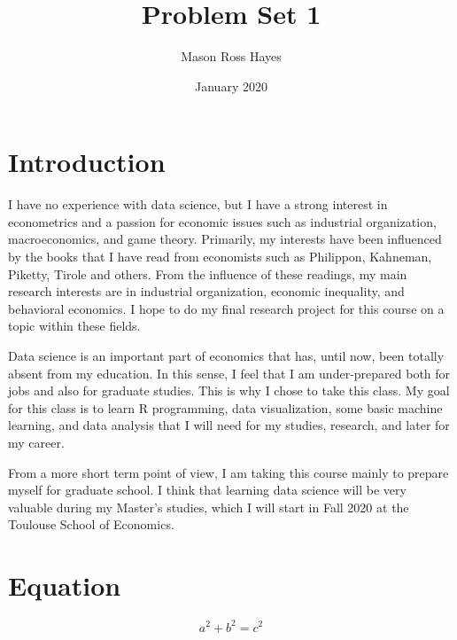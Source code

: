 \documentclass{article}
\title{Problem Set 1}
\author{Mason Ross Hayes}
\date{January 2020}
\begin{document}
\maketitle

\section{Introduction}
I have no experience with data science, but I have a strong interest in econometrics and a passion for economic issues such as industrial organization, macroeconomics, and game theory. Primarily, my interests have been influenced by the books that I have read from economists such as Philippon, Kahneman, Piketty, Tirole and others. From the influence of these readings, my main research interests are in industrial organization, economic inequality, and behavioral economics. I hope to do my final research project for this course on a topic within these fields.

Data science is an important part of economics that has, until now, been totally absent from my education. In this sense, I feel that I am under-prepared both for jobs and also for graduate studies. This is why I chose to take this class. My goal for this class is to learn R programming, data visualization, some basic machine learning, and data analysis that I will need for my studies, research, and later for my career.

From a more short term point of view, I am taking this course mainly to prepare myself for graduate school. I think that learning data science will be very valuable during my Master's studies, which I will start in Fall 2020 at the Toulouse School of Economics.



\section{Equation}



\begin{equation}
a^2 + b^2 = c^2
\end{equation}
\end{document}
